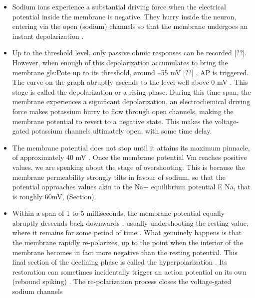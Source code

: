 \documentclass[class={myRUCProject}, crop=false]{standalone}
\begin{document}
\begin{itemize}
\item Sodium ions experience a substantial driving force when the electrical potential inside the membrane is negative. They hurry inside the neuron, entering via the open (sodium) channels so that the membrane undergoes an instant depolarization \cite{wood1996neuroscience}. 

\item Up to the threshold level, only passive ohmic responses can be recorded [??]. However, when enough of this depolarization accumulates to bring the membrane \gls{gls:Pote} up to its threshold, around –55 mV [??] \cite{hammond2015voltage}, AP is triggered. The curve on the graph abruptly ascends to the level well above 0 mV \cite{ramachandran2002encyclopedia}. This stage is called the depolarization or a rising phase. During this time-span, the membrane experiences a significant depolarization, an electrochemical driving force makes potassium hurry to flow through open channels, making the membrane potential to revert to a negative state. This makes the voltage-gated potassium channels ultimately open, with some time delay. 

\item The membrane potential does not stop until it attains its maximum pinnacle, of approximately 40 mV \cite{wood1996neuroscience}. Once the membrane potential Vm reaches positive values, we are speaking about the stage of overshooting. This is because the membrane permeability strongly tilts in favour of sodium, so that the potential approaches values akin to the Na+ equilibrium potential E Na, that is roughly 60mV, (Section). 

\item Within a span of 1 to 5 milliseconds, the membrane potential equally abruptly descends back downwards \cite{ramachandran2002encyclopedia}, usually undershooting the resting value, where it remains for some period of time \cite{ramachandran2002encyclopedia}. What genuinely happens is that the membrane rapidly re-polarizes, up to the point when the interior of the membrane becomes in fact more negative than the resting potential. This final section of the declining phase is called the hyperpolarization \cite{wood1996neuroscience}. Its restoration can sometimes incidentally trigger an action potential on its own (rebound spiking) \cite{ramachandran2002encyclopedia}. The re-polarization process closes the voltage-gated sodium channels

\end{itemize}
\end{document}
